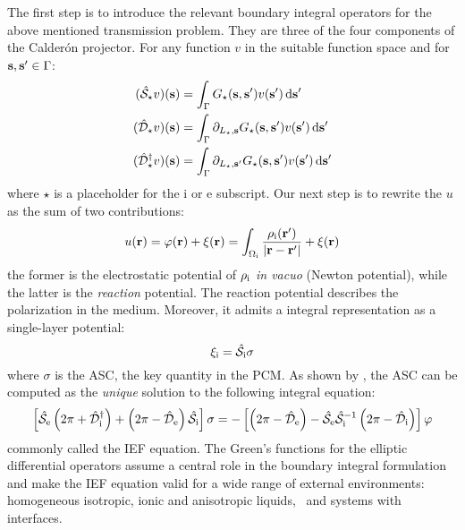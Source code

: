 The first step is to introduce the relevant boundary integral operators for the
above mentioned transmission problem.
They are three of the four components of the Calder\'on projector.
For any function $v$ in the suitable function space and for $\mathbf{s}, \mathbf{s}^\prime \in \Gamma$:
\begin{equation}
\begin{aligned}
  (\hat{\mathcal{S}}_\star v)(\mathbf{s}) &= \int_\Gamma
  G_\star(\mathbf{s}, \mathbf{s}^\prime)v(\mathbf{s}^\prime)\mathop{}\!\mathrm{d} \mathbf{s}^\prime \\
  (\hat{\mathcal{D}}_\star v)(\mathbf{s}) &= \int_\Gamma \partial_{L_\star,\mathbf{s}}
  G_\star(\mathbf{s}, \mathbf{s}^\prime)v(\mathbf{s}^\prime)\mathop{}\!\mathrm{d} \mathbf{s}^\prime \\
  (\hat{\mathcal{D}}^\dagger_\star v)(\mathbf{s}) &= \int_\Gamma
\partial_{L_\star,\mathbf{s}^\prime}
  G_\star(\mathbf{s}, \mathbf{s}^\prime)v(\mathbf{s}^\prime)\mathop{}\!\mathrm{d} \mathbf{s}^\prime \\
\end{aligned}
\end{equation}
where $\star$ is a placeholder for the $\mathrm{i}$ or $\mathrm{e}$ subscript.
Our next step is to rewrite the $u$ as the sum of two contributions:
\begin{equation}
  u(\mathbf{r}) = \varphi(\mathbf{r}) + \xi(\mathbf{r}) = \int_{\Omega_\mathrm{i}}
  \frac{\rho_\mathrm{i}(\mathbf{r}^\prime)}{|\mathbf{r}-\mathbf{r}^\prime|}
  + \xi(\mathbf{r})
\end{equation}
the former is the electrostatic potential of $\rho_\mathrm{i}$ \emph{in vacuo}
(Newton potential), while the latter is the \emph{reaction} potential.
The reaction potential describes the polarization in the medium.
Moreover, it admits a integral representation as a single-layer
potential:
\begin{equation}
  \xi_\mathrm{i} = \hat{\mathcal{S}}_\mathrm{i}\sigma
\end{equation}
where $\sigma$ is the \ac{ASC}, the key quantity in the \acs{PCM}.
As shown by \citeauthor{Cances1998-og}, the \acs{ASC} can be computed
as the \emph{unique} solution to the following integral equation:
\begin{equation}\label{eq:full-IEF}
  \left[ \hat{\mathcal{S}}_\mathrm{e}\left(2\pi + \hat{\mathcal{D}}^\dagger_\mathrm{i}\right)
  +
  \left(2\pi - \hat{\mathcal{D}}_\mathrm{e}\right)\hat{\mathcal{S}}_\mathrm{i}
  \right]\sigma =
  -\left[\left(2\pi-\hat{\mathcal{D}}_\mathrm{e}\right)
  -\hat{\mathcal{S}}_\mathrm{e}\hat{\mathcal{S}}_\mathrm{i}^{-1}
  \left(2\pi-\hat{\mathcal{D}}_\mathrm{i}\right)
  \right]\varphi
\end{equation}
commonly called the \ac{IEF} equation.
The Green's functions for the elliptic differential operators
assume a central role in the boundary integral formulation and make the
\acs{IEF} equation valid for a wide range of external
environments: homogeneous isotropic, ionic and anisotropic
liquids,~\autocite{Cances1998-og}
and systems with interfaces.~\autocite{Corni2002-dr, Frediani2004-er,
Delgado2013-kd, DiRemigio2016-nn}


